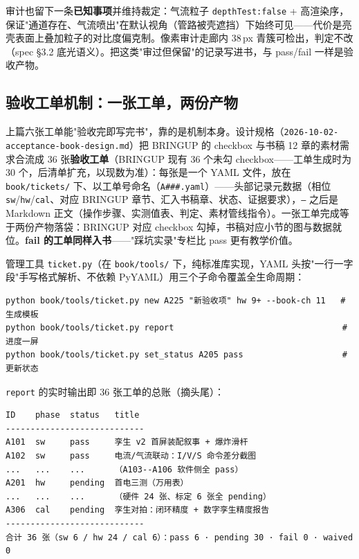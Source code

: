 审计也留下一条\textbf{已知事项}并维持裁定：气流粒子 \texttt{depthTest:false} + 高渲染序，保证"通道存在、气流喷出"在默认视角（管路被壳遮挡）下始终可见——代价是亮壳表面上叠加粒子的对比度偏克制。像素审计走廊内 38\,px 青簇可检出，判定不改（spec \S3.2 底光语义）。把这类"审过但保留"的记录写进书，与 pass/fail 一样是验收产物。

\subsection{验收工单机制：一张工单，两份产物}
\label{sec:acc-ticket}

上篇六张工单能"验收完即写完书"，靠的是机制本身。设计规格（\texttt{2026-10-02-acceptance-book-design.md}）把 BRINGUP 的 checkbox 与书稿 12 章的素材需求合流成 36 张\textbf{验收工单}（BRINGUP 现有 36 个未勾 checkbox——工单生成时为 30 个，后清单扩充，以现数为准）：每张是一个 YAML 文件，放在 \texttt{book/tickets/} 下、以工单号命名（\texttt{A\#\#\#.yaml}）——头部记录元数据（相位 \texttt{sw}/\texttt{hw}/\texttt{cal}、对应 BRINGUP 章节、汇入书稿章、状态、证据要求），\texttt{---} 之后是 Markdown 正文（操作步骤、实测值表、判定、素材管线指令）。一张工单完成等于两份产物落袋：BRINGUP 对应 checkbox 勾掉，书稿对应小节的图与数据就位。\textbf{fail 的工单同样入书}——"踩坑实录"专栏比 pass 更有教学价值。

管理工具 \texttt{ticket.py}（在 \texttt{book/tools/} 下，纯标准库实现，YAML 头按"一行一字段"手写格式解析、不依赖 PyYAML）用三个子命令覆盖全生命周期：

\begin{lstlisting}[basicstyle=\small\ttfamily, breaklines=true,
  caption={ticket.py 用法（自项目根）}]
python book/tools/ticket.py new A225 "新验收项" hw 9+ --book-ch 11   # 生成模板
python book/tools/ticket.py report                                  # 进度一屏
python book/tools/ticket.py set_status A205 pass                    # 更新状态
\end{lstlisting}

\texttt{report} 的实时输出即 36 张工单的总账（摘头尾）：

\begin{lstlisting}[basicstyle=\small\ttfamily, breaklines=true,
  caption={ticket.py report 输出（2026-10-02，摘录）}]
ID    phase  status   title
----------------------------
A101  sw     pass     孪生 v2 首屏装配叙事 + 爆炸滑杆
A102  sw     pass     电流/气流联动：I/V/S 命令差分截图
...   ...    ...      （A103--A106 软件侧全 pass）
A201  hw     pending  首电三测（万用表）
...   ...    ...      （硬件 24 张、标定 6 张全 pending）
A306  cal    pending  孪生对拍：闭环精度 + 数字孪生精度报告
----------------------------
合计 36 张（sw 6 / hw 24 / cal 6）：pass 6 · pending 30 · fail 0 · waived 0
\end{lstlisting}


